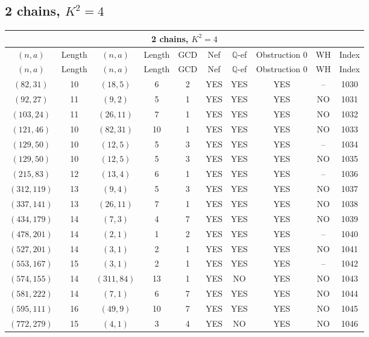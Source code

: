 \subsection{2 chains, $K^2 = 4$}
\begin{longtable}{|c|c|c|c|c|c|c|c|c|c|}
\hline
\multicolumn{10}{|c|}{2 chains, $K^2 = 4$}\\
\hline
$(n,a)$ & Length & $(n,a)$ & Length & GCD & Nef & $\mathbb Q$-ef & Obstruction 0 & WH & Index\\
\hline
\endfirsthead

\hline
$(n,a)$ & Length & $(n,a)$ & Length & GCD & Nef & $\mathbb Q$-ef & Obstruction 0 & WH & Index\\
\hline
\endhead
\hline
\endfoot

$(82, 31)$ & 10 & $(18, 5)$ & 6 & 2 & YES & YES & YES & -- & 1030\\
$(92, 27)$ & 11 & $(9, 2)$ & 5 & 1 & YES & YES & YES & NO & 1031\\
$(103, 24)$ & 11 & $(26, 11)$ & 7 & 1 & YES & YES & YES & NO & 1032\\
$(121, 46)$ & 10 & $(82, 31)$ & 10 & 1 & YES & YES & YES & NO & 1033\\
$(129, 50)$ & 10 & $(12, 5)$ & 5 & 3 & YES & YES & YES & -- & 1034\\
$(129, 50)$ & 10 & $(12, 5)$ & 5 & 3 & YES & YES & YES & NO & 1035\\
$(215, 83)$ & 12 & $(13, 4)$ & 6 & 1 & YES & YES & YES & -- & 1036\\
$(312, 119)$ & 13 & $(9, 4)$ & 5 & 3 & YES & YES & YES & NO & 1037\\
$(337, 141)$ & 13 & $(26, 11)$ & 7 & 1 & YES & YES & YES & NO & 1038\\
$(434, 179)$ & 14 & $(7, 3)$ & 4 & 7 & YES & YES & YES & NO & 1039\\
$(478, 201)$ & 14 & $(2, 1)$ & 1 & 2 & YES & YES & YES & -- & 1040\\
$(527, 201)$ & 14 & $(3, 1)$ & 2 & 1 & YES & YES & YES & NO & 1041\\
$(553, 167)$ & 15 & $(3, 1)$ & 2 & 1 & YES & YES & YES & -- & 1042\\
$(574, 155)$ & 14 & $(311, 84)$ & 13 & 1 & YES & NO & YES & NO & 1043\\
$(581, 222)$ & 14 & $(7, 1)$ & 6 & 7 & YES & YES & YES & NO & 1044\\
$(595, 111)$ & 16 & $(49, 9)$ & 10 & 7 & YES & YES & YES & NO & 1045\\
$(772, 279)$ & 15 & $(4, 1)$ & 3 & 4 & YES & NO & YES & NO & 1046\\

\end{longtable}
